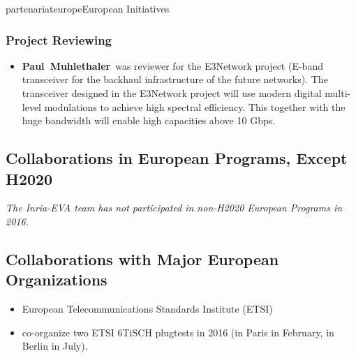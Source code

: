 \documentclass{ra2016}
\newcommand{\paul}             {\textbf{Paul~Muhlethaler}}
\begin{document}
\begin{module}{partenariat}{europe}{European Initiatives}
\subsubsection{Project Reviewing} 

\begin{itemize}
    \item \paul~was reviewer for the E3Network project  (E-band transceiver for the backhaul infrastructure of the future networks). The transceiver designed in the E3Network project will use modern digital multi-level modulations to achieve high spectral efficiency. This together with the huge bandwidth will enable high capacities above 10 Gbps.
\end{itemize}

\subsection{Collaborations in European Programs, Except H2020}

\textit{The Inria-EVA team has not participated in non-H2020 European Programs in 2016.}

\subsection{Collaborations with Major European Organizations}

\begin{itemize}
    \item European Telecommunications Standards Institute (ETSI)\
    \item co-organize two ETSI 6TiSCH plugtests in 2016 (in Paris in February, in Berlin in July).
\end{itemize}

\end{module}

 
\end{document}
